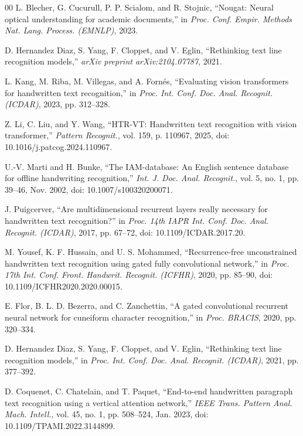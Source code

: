 \documentclass{IEEEtran}
\begin{document}
\begin{thebibliography}{00}
 L. Blecher, G. Cucurull, P. P. Scialom, and R. Stojnic, ``Nougat: Neural optical understanding for academic documents,'' in \emph{Proc. Conf. Empir. Methods Nat. Lang. Process. (EMNLP)}, 2023.

 D. Hernandez Diaz, S. Yang, F. Cloppet, and V. Eglin, ``Rethinking text line recognition models,'' \emph{arXiv preprint arXiv:2104.07787}, 2021.

 L. Kang, M. Riba, M. Villegas, and A. Forn{\'e}s, ``Evaluating vision transformers for handwritten text recognition,'' in \emph{Proc. Int. Conf. Doc. Anal. Recognit. (ICDAR)}, 2023, pp. 312--328.

 Z. Li, C. Liu, and Y. Wang, ``HTR-VT: Handwritten text recognition with vision transformer,'' \emph{Pattern Recognit.}, vol. 159, p. 110967, 2025, doi: 10.1016/j.patcog.2024.110967.

 U.-V. Marti and H. Bunke, ``The IAM-database: An English sentence database for offline handwriting recognition,'' \emph{Int. J. Doc. Anal. Recognit.}, vol. 5, no. 1, pp. 39--46, Nov. 2002, doi: 10.1007/s100320200071.

 J. Puigcerver, ``Are multidimensional recurrent layers really necessary for handwritten text recognition?'' in \emph{Proc. 14th IAPR Int. Conf. Doc. Anal. Recognit. (ICDAR)}, 2017, pp. 67--72, doi: 10.1109/ICDAR.2017.20.

 M. Yousef, K. F. Hussain, and U. S. Mohammed, ``Recurrence-free unconstrained handwritten text recognition using gated fully convolutional network,'' in \emph{Proc. 17th Int. Conf. Front. Handwrit. Recognit. (ICFHR)}, 2020, pp. 85--90, doi: 10.1109/ICFHR2020.2020.00015.

 E. Flor, B. L. D. Bezerra, and C. Zanchettin, ``A gated convolutional recurrent neural network for cuneiform character recognition,'' in \emph{Proc. BRACIS}, 2020, pp. 320--334.

 D. Hernandez Diaz, S. Yang, F. Cloppet, and V. Eglin, ``Rethinking text line recognition models,'' in \emph{Proc. Int. Conf. Doc. Anal. Recognit. (ICDAR)}, 2021, pp. 377--392.

 D. Coquenet, C. Chatelain, and T. Paquet, ``End-to-end handwritten paragraph text recognition using a vertical attention network,'' \emph{IEEE Trans. Pattern Anal. Mach. Intell.}, vol. 45, no. 1, pp. 508--524, Jan. 2023, doi: 10.1109/TPAMI.2022.3144899.


\end{thebibliography}
\end{document}
